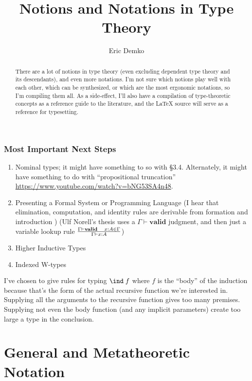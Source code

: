 \documentclass[11pt]{article} %
\title{Notions and Notations in Type Theory}
\author{Eric Demko}
\theoremstyle{definition}
\theoremstyle{remark}
\begin{document}
\maketitle
\begin{abstract}
There are a lot of notions in type theory (even excluding dependent type theory and its descendants), and even more notations.
I'm not sure which notions play well with each other, which can be synthesized, or which are the most ergonomic notations, so I'm compiling them all.
As a side-effect, I'll also have a compilation of type-theoretic concepts as a reference guide to the literature, and the \LaTeX{} source will serve as a reference for typesetting.
\end{abstract}

\section*{Most Important Next Steps}

\begin{enumerate}
  \item Nominal types; it might have something to so with \cite{diy_1989}\S3.4. Alternately, it might have something to do with ``propositional truncation'' \url{https://www.youtube.com/watch?v=bNG53SA4n48}.
  \item Presenting a Formal System or Programming Language
    (I hear that elimination, computation, and identity rules are derivable from formation and introduction \cite{diy_1989})
    (Ulf Norell's thesis uses a $\Gamma \vdash \mathbf{valid}$ judgment, and then just a variable lookup rule $\Gamma \vdash \mathbf{valid} \quad x:A \in \Gamma \over \Gamma \vdash x : A$)
  \item Higher Inductive Types
  \item Indexed W-types
\end{enumerate}

I've chosen to give rules for typing $\ind\;f$ where $f$ is the ``body'' of the induction because that's the form of the actual recursive function we're interested in.
Supplying all the arguments to the recursive function gives too many premises.
Supplying not even the body function (and any implicit parameters) create too large a type in the conclusion.

\tableofcontents
\pagebreak




\part{General and Metatheoretic Notation}
\end{document}
